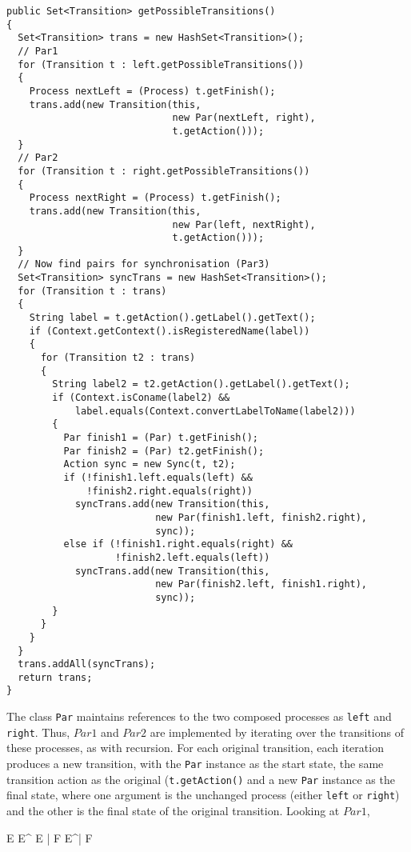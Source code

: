 \begin{verbatim}
public Set<Transition> getPossibleTransitions()
{
  Set<Transition> trans = new HashSet<Transition>();
  // Par1
  for (Transition t : left.getPossibleTransitions())
  {
    Process nextLeft = (Process) t.getFinish();
    trans.add(new Transition(this,
                             new Par(nextLeft, right),
                             t.getAction()));
  }
  // Par2
  for (Transition t : right.getPossibleTransitions())
  {
    Process nextRight = (Process) t.getFinish();
    trans.add(new Transition(this,
                             new Par(left, nextRight),
                             t.getAction()));
  }
  // Now find pairs for synchronisation (Par3)
  Set<Transition> syncTrans = new HashSet<Transition>();
  for (Transition t : trans)
  {
    String label = t.getAction().getLabel().getText();
    if (Context.getContext().isRegisteredName(label))
    {
      for (Transition t2 : trans)
      {
        String label2 = t2.getAction().getLabel().getText();
        if (Context.isConame(label2) &&
            label.equals(Context.convertLabelToName(label2)))
        {
          Par finish1 = (Par) t.getFinish();
          Par finish2 = (Par) t2.getFinish();
          Action sync = new Sync(t, t2);
          if (!finish1.left.equals(left) &&
              !finish2.right.equals(right))
            syncTrans.add(new Transition(this,
                          new Par(finish1.left, finish2.right),
                          sync));
          else if (!finish1.right.equals(right) &&
                   !finish2.left.equals(left))
            syncTrans.add(new Transition(this,
                          new Par(finish2.left, finish1.right),
                          sync));
        }
      }
    }
  }
  trans.addAll(syncTrans);
  return trans;
}
\end{verbatim}

The class \texttt{Par} maintains references to the two composed
processes as \texttt{left} and \texttt{right}.  Thus, $Par1$ and
$Par2$ are implemented by iterating over the transitions of these
processes, as with recursion.  For each original transition, each
iteration produces a new transition, with the \texttt{Par} instance as
the start state, the same transition action as the original
(\texttt{t.getAction()} and a new \texttt{Par} instance as the final
state, where one argument is the unchanged process (either
\texttt{left} or \texttt{right}) and the other is the final state of
the original transition.  Looking at $Par1$,

\begin{center}
     {E \derives{\alpha} E^\prime}
     {E \;|\; F \derives{\alpha} E^\prime \;|\; F}
     {}
\end{center}

